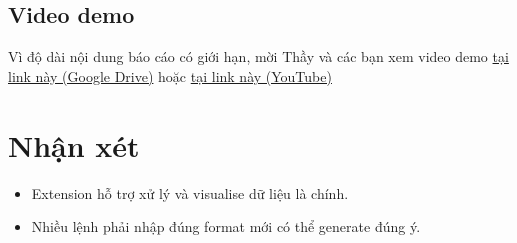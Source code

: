 \documentclass[12pt]{article}
\begin{document}
\subsection{Video demo}
Vì độ dài nội dung báo cáo có giới hạn, mời Thầy và các bạn xem video demo \href{https://drive.google.com/file/d/1-0ovjPw-pQ_yhcciZBPsEiTubgGCw6MW/view?usp=sharing}{tại link này (Google Drive)} hoặc \href{https://www.youtube.com/watch?v=6i1KpdBGV1I}{tại link này (YouTube)}

\section{Nhận xét}
\begin{itemize}
\item Extension hỗ trợ xử lý và visualise dữ liệu là chính.
\item Nhiều lệnh phải nhập đúng format mới có thể generate đúng ý.
\end{itemize}
\end{document}

